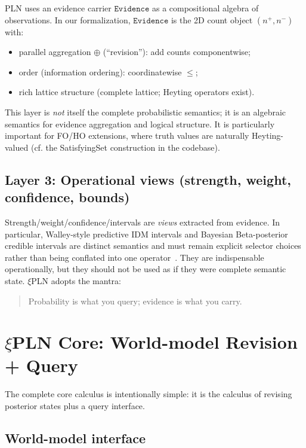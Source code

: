 \documentclass[]{article}
\newcommand{\xiPLN}{\texorpdfstring{$\xi$}{xi}\textup{PLN}}
\newcommand{\ty}[1]{\ensuremath{\mathtt{#1}}}
\newcommand{\Evidence}{\ty{Evidence}}
\newcommand{\hplus}{\ensuremath{\oplus}}
\begin{document}
PLN uses an evidence carrier \Evidence{} as a compositional algebra of observations.
In our formalization, \Evidence{} is the 2D count object $(n^+,n^-)$ with:
\begin{itemize}
\item parallel aggregation \hplus{} (``revision''): add counts componentwise;
\item order (information ordering): coordinatewise $\le$;
\item rich lattice structure (complete lattice; Heyting operators exist).
\end{itemize}

This layer is \emph{not} itself the complete probabilistic semantics; it is an algebraic
semantics for evidence aggregation and logical structure.
It is particularly important for FO/HO extensions, where truth values are naturally
Heyting-valued (cf. the SatisfyingSet construction in the codebase).

\subsection{Layer 3: Operational views (strength, weight, confidence, bounds)}

Strength/weight/confidence/intervals are \emph{views} extracted from evidence.
In particular, Walley-style predictive IDM intervals and Bayesian Beta-posterior
credible intervals are distinct semantics and must remain explicit selector choices
rather than being conflated into one operator~\cite{Walley1991,Walley1996BagOfMarbles,BenavoliDeCampos2009MLEDominance}.
They are indispensable operationally, but they should not be used as if they were complete
semantic state.  \xiPLN{} adopts the mantra:

\begin{quote}
Probability is what you query; evidence is what you carry.
\end{quote}

\section{\xiPLN{} Core: World-model Revision + Query}

The complete core calculus is intentionally simple: it is the calculus of revising posterior
states plus a query interface.

\subsection{World-model interface}
\end{document}
